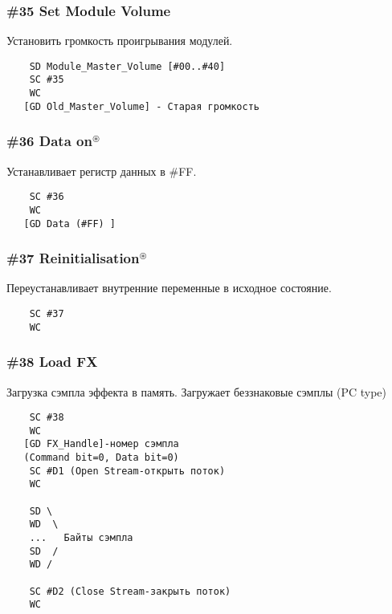 \documentclass[a4paper,11pt]{article}
\DeclareRobustCommand{\Cyrax}{\texorpdfstring{\(^\circledast\)}{\circledast}}
\begin{document}
\subsubsection{\#35 Set Module Volume}
Установить громкость проигрывания модулей.
\begin{verbatim}
    SD Module_Master_Volume [#00..#40]
    SC #35
    WC
   [GD Old_Master_Volume] - Старая громкость
\end{verbatim}

\subsubsection{\#36 Data on\Cyrax}
Устанавливает регистр данных в \#FF.
\begin{verbatim}
    SC #36
    WC
   [GD Data (#FF) ]
\end{verbatim}

\subsubsection{\#37 Reinitialisation\Cyrax}
Переустанавливает внутренние переменные в исходное состояние.
\begin{verbatim}
    SC #37
    WC
\end{verbatim}

\subsubsection{\#38 Load FX\label{cmd:38}}
Загрузка сэмпла эффекта в память. Загружает беззнаковые сэмплы (PC type)
\begin{verbatim}
    SC #38
    WC
   [GD FX_Handle]-номер сэмпла
   (Command bit=0, Data bit=0)
    SC #D1 (Open Stream-открыть поток)
    WC

    SD \
    WD  \
    ...   Байты сэмпла
    SD  /
    WD /

    SC #D2 (Close Stream-закрыть поток)
    WC
\end{verbatim}
\end{document}
